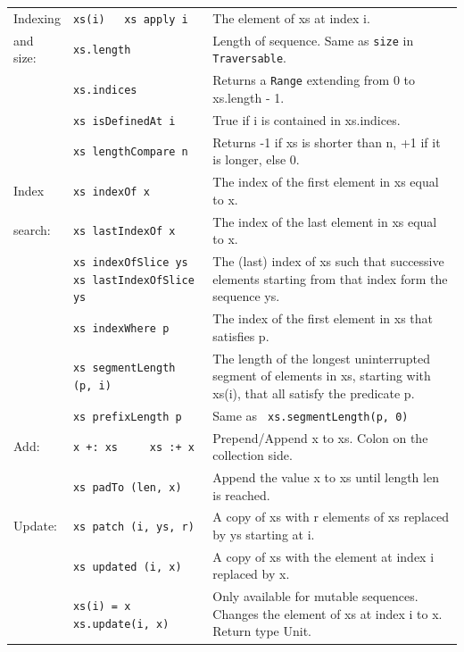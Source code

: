 \documentclass[article, a5paper]{memoir}
\renewcommand{\arraystretch}{0.9}
\begin{document}
{\small\renewcommand{\arraystretch}{1.1}
\begin{tabular}{@{}l p{3.75cm} p{6.8cm}}


  Indexing & \texttt{xs(i)  ~ xs apply i} & The element of xs at index i.\\   \cline{2-3}

   and size: & \texttt{xs.length} & Length of sequence. Same as \texttt{size} in \texttt{Traversable}.\\\cline{2-3}
   & \texttt{xs.indices} & Returns a \texttt{Range} extending from 0 to xs.length - 1.\\\cline{2-3}
   & \texttt{xs isDefinedAt i} & True if i is contained in xs.indices.\\\cline{2-3}
   & \texttt{xs lengthCompare n} & Returns -1 if xs is shorter than n, +1 if it is longer, else 0. \\\cline{1-3}

  
  Index & \texttt{xs indexOf x} & The index of the first element in xs equal to x.\\   \cline{2-3}
  search: & \texttt{xs lastIndexOf x} & The index of the last element in xs equal to x.\\\cline{2-3}
   & \texttt{xs indexOfSlice ys \newline xs lastIndexOfSlice ys} & The (last) index of xs such that successive elements starting from that index form the sequence ys.\\\cline{2-3}
   & \texttt{xs indexWhere p} & The index of the first element in xs that satisfies p.\\\cline{2-3}
   & \texttt{xs segmentLength (p, i)} & The length of the longest uninterrupted segment of elements in xs, starting with xs(i), that all satisfy the predicate p.\\\cline{2-3}
   & \texttt{xs prefixLength p} &  	Same as \texttt{ xs.segmentLength(p, 0)}\\\cline{1-3}


  Add: & {\texttt{x~+:~xs~~~~~xs~:+~x}}  & Prepend/Append x to xs. Colon on the collection side. \\   \cline{2-3}
   & \texttt{xs padTo (len, x)} & Append the value x to xs until length len is reached.\\\cline{1-3}
        

  Update: & \texttt{xs patch (i, ys, r)} &  A copy of xs with r elements of xs replaced by ys starting at i. \\   \cline{2-3}
   & \texttt{xs updated (i, x)} & A copy of xs with the element at index i replaced by x.\\\cline{2-3}
   & \texttt{xs(i) = x \newline xs.update(i, x)} & Only available for mutable sequences. Changes the element of xs at index i to x. Return type Unit.\\\cline{1-3}
        


\end{tabular}}
\end{document}
